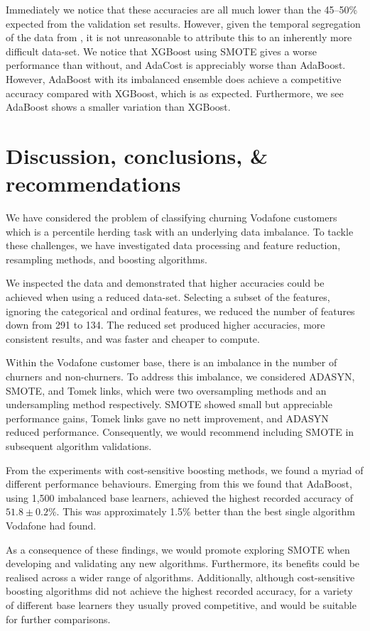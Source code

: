 \documentclass[english,a4paper,oneside,9pt]{extarticle}
\begin{document}
Immediately we notice that these accuracies are all much lower than the 45--50\% expected from the validation set results.  However, given the temporal segregation of the data from , it is not unreasonable to attribute this to an inherently more difficult data-set. We notice that XGBoost using SMOTE gives a worse performance than without, and AdaCost is appreciably worse than AdaBoost. However, AdaBoost with its imbalanced ensemble does achieve a competitive accuracy compared with XGBoost, which is as expected. Furthermore, we see AdaBoost shows a smaller variation than XGBoost.

\section{Discussion, conclusions, \& recommendations}

We have considered the problem of classifying churning Vodafone customers which is a percentile herding task with an underlying data imbalance. To tackle these challenges, we have investigated data processing and feature reduction, resampling methods, and boosting algorithms. 

We inspected the data and demonstrated that higher accuracies could be achieved when using a reduced data-set. Selecting a subset of the features, ignoring the categorical and ordinal features, we reduced the number of features down from 291 to 134. The reduced set produced higher accuracies, more consistent results, and was faster and cheaper to compute. 

Within the Vodafone customer base, there is an imbalance in the number of churners and non-churners. To address this imbalance, we considered ADASYN, SMOTE, and Tomek links, which were two oversampling methods and an undersampling method respectively. SMOTE showed small but appreciable performance gains, Tomek links gave no nett improvement, and ADASYN reduced performance. Consequently, we would recommend including SMOTE in subsequent algorithm validations. 

From the experiments with cost-sensitive boosting methods, we found a myriad of different performance behaviours. Emerging from this we found that AdaBoost, using 1,500 imbalanced base learners, achieved the highest recorded accuracy of $ 51.8\pm 0.2 $\%. This was approximately 1.5\% better than the best single algorithm Vodafone had found.

As a consequence of these findings, we would promote exploring SMOTE when developing and validating any new algorithms. Furthermore, its benefits could be realised across a wider range of algorithms. Additionally, although cost-sensitive boosting algorithms did not achieve the highest recorded accuracy, for a variety of different base learners they usually proved competitive, and would be suitable for further comparisons.
\end{document}
